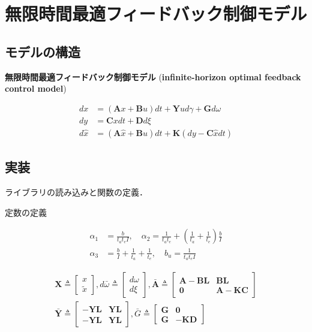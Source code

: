 \section{無限時間最適フィードバック制御モデル}
\subsection{モデルの構造}
\textbf{無限時間最適フィードバック制御モデル} (\textbf{infinite-horizon optimal feedback control model}) \cite{Qian2013-zy}


\begin{align}
d x&=(\mathbf{A} x+\mathbf{B} u) dt +\mathbf{Y} u d \gamma+\mathbf{G} d \omega \\
d y&=\mathbf{C} x dt+\mathbf{D} d \xi\\
d \hat{x}&=(\mathbf{A} \hat{x}+\mathbf{B} u) dt+\mathbf{K}(dy-\mathbf{C} \hat{x} dt)
\end{align}
\subsection{実装}
ライブラリの読み込みと関数の定義．

定数の定義


\begin{align}
\alpha_{1}&=\frac{b}{t_{a} t_{e} I},\quad \alpha_{2}=\frac{1}{t_{a} t_{e}}+\left(\frac{1}{t_{a}}+\frac{1}{t_{e}}\right) \frac{b}{I} \\
\alpha_{3}&=\frac{b}{I}+\frac{1}{t_{a}}+\frac{1}{t_{e}},\quad b_{u}=\frac{1}{t_{a} t_{e} I}
\end{align}


\begin{align}
\mathbf{X}\triangleq\begin{bmatrix}
x \\
\tilde{x}
\end{bmatrix}, d \bar{\omega} \triangleq\begin{bmatrix}
d \omega \\
d \xi
\end{bmatrix}, \bar{\mathbf{A}} \triangleq\begin{bmatrix}
\mathbf{A}-\mathbf{B} \mathbf{L} & \mathbf{B} \mathbf{L} \\
\mathbf{0} & \mathbf{A}-\mathbf{K} \mathbf{C}
\end{bmatrix}\\
\bar{\mathbf{Y}} \triangleq\begin{bmatrix}
-\mathbf{Y} \mathbf{L} & \mathbf{Y} \mathbf{L} \\
-\mathbf{Y} \mathbf{L} & \mathbf{Y} \mathbf{L}
\end{bmatrix}, \bar{G} \triangleq\begin{bmatrix}
\mathbf{G} & \mathbf{0} \\
\mathbf{G} & -\mathbf{K} \mathbf{D}
\end{bmatrix}
\end{align}


